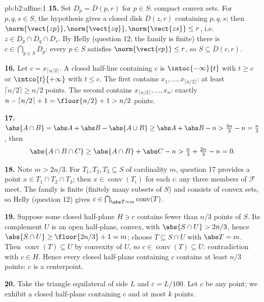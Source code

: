 \begin{solution}{pb:b2:affine:1}
\textbf{15.} Set $D_p = \overline D(p, r)$ for $p \in S$:
compact convex sets. For $p, q, s \in S$, the hypothesis
gives a closed disk $\overline D(z, r)$ containing $p, q, s$;
then $\norm{\vect{zp}}, \norm{\vect{zq}}, \norm{\vect{zs}}
\leq r$, i.e.\ $z \in D_p \cap D_q \cap D_s$. By Helly
(question 12; the family is finite) there is $c \in
\bigcap_{p \in S}D_p$: every $p \in S$ satisfies
$\norm{\vect{cp}} \leq r$, so $S \subseteq \overline D(c,
r)$.

\textbf{16.} Let $c = x_{\lceil n/2\rceil}$. A closed
half-line containing $c$ is $\intoc{-\infty}{t}$ with $t \geq
c$ or $\intco{t}{+\infty}$ with $t \leq c$. The first
contains $x_1, \dots, x_{\lceil n/2\rceil}$: at least
$\lceil n/2\rceil \geq n/2$ points. The second contains
$x_{\lceil n/2\rceil}, \dots, x_n$: exactly $n - \lceil
n/2\rceil + 1 = \floor{n/2} + 1 > n/2$ points.

\textbf{17.} $\abs{A \cap B} = \abs A + \abs B - \abs{A \cup
B} \geq \abs A + \abs B - n > \tfrac{4n}3 - n = \tfrac n3$,
then
\[
\abs{A \cap B \cap C} \geq \abs{A \cap B} + \abs C - n >
\tfrac n3 + \tfrac{2n}3 - n = 0 .
\]

\textbf{18.} Note $m > 2n/3$. For $T_1, T_2, T_3 \subseteq S$
of cardinality $m$, question 17 provides a point $x \in T_1
\cap T_2 \cap T_3$; then $x \in \operatorname{conv}(T_i)$ for
each $i$: any three members of $\mathcal F$ meet. The family
is finite (finitely many subsets of $S$) and consists of
convex sets, so Helly (question 12) gives $c \in
\bigcap_{\abs T = m}\operatorname{conv}(T)$.

\textbf{19.} Suppose some closed half-plane $H \ni c$
contains fewer than $n/3$ points of $S$. Its complement $U$
is an open half-plane, convex, with $\abs{S \cap U} > 2n/3$,
hence $\abs{S \cap U} \geq \floor{2n/3} + 1 = m$; choose $T
\subseteq S \cap U$ with $\abs T = m$. Then
$\operatorname{conv}(T) \subseteq U$ by convexity of $U$, so
$c \in \operatorname{conv}(T) \subseteq U$: contradiction
with $c \in H$. Hence every closed half-plane containing $c$
contains at least $n/3$ points: $c$ is a centerpoint.

\textbf{20.} Take the triangle equilateral of side $L$ and
$\varepsilon = L/100$. Let $c$ be any point; we exhibit a
closed half-plane containing $c$ and at most $k$ points.


\end{solution}
